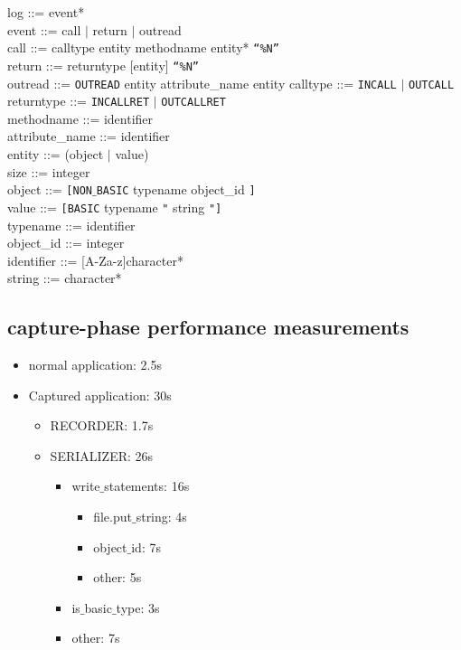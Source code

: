 \documentclass[a4paper,10pt]{report}
\begin{document}
log ::= event* \\
event ::= call $\mid$ return $\mid$ outread\\
call ::= calltype entity methodname entity* \texttt{“\%N”} \\
return ::= returntype [entity]  \texttt{“\%N”}\\
outread ::= \texttt{OUTREAD} entity attribute\_name entity
calltype ::= \texttt{INCALL} $\mid$ \texttt{OUTCALL} \\
returntype ::= \texttt{INCALLRET} $\mid$ \texttt{OUTCALLRET} \\
methodname ::= identifier \\
attribute\_name ::= identifier \\
entity ::= (object $\mid$ value) \\
size ::= integer \\
object ::= \texttt{[NON$\_$BASIC} typename object\_id \texttt{]} \\
value ::= \texttt{[BASIC} typename \texttt{"} string \texttt{"]} \\
typename ::= identifier \\
object\_id ::= integer\\
identifier ::= [A-Za-z]character*\\
string ::= character*\\

\subsection{capture-phase performance measurements}
\begin{itemize}
	\item normal application: 2.5s
	\item Captured application: 30s
	\begin{itemize}
		\item RECORDER: 1.7s\\
		\item SERIALIZER: 26s
		\begin{itemize}
			\item write$\_$statements: 16s
			\begin{itemize}
				\item file.put$\_$string: 4s
				\item object$\_$id: 7s
				\item other: 5s
			\end{itemize}
			\item is$\_$basic$\_$type: 3s
			\item other: 7s
		\end{itemize}
	\end{itemize}
\end{itemize}

 

\end{document}
